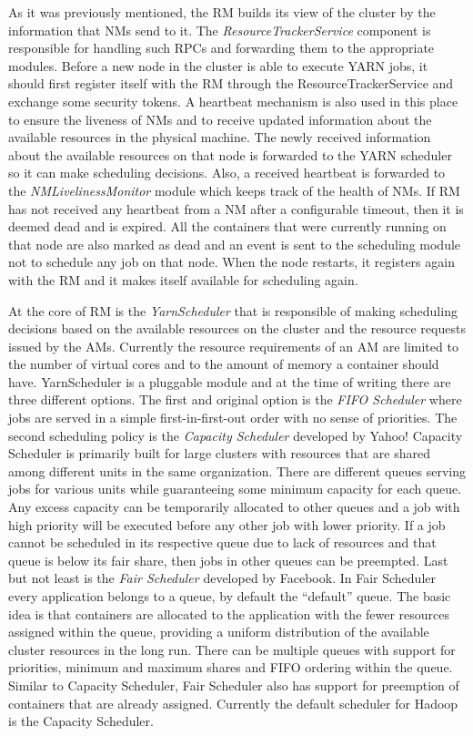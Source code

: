 As it was previously mentioned, the RM builds its view of the cluster
by the information that NMs send to it. The
\emph{ResourceTrackerService} component is responsible for handling such RPCs
and forwarding them to the appropriate modules. Before a new node in the
cluster is able to execute YARN jobs, it should first register itself
with the RM through the ResourceTrackerService and exchange some
security tokens. A heartbeat mechanism is also used in this place to
ensure the liveness of NMs and to receive updated information about
the available resources in the physical machine. The newly received
information about the available resources on that node is forwarded to the YARN
scheduler so it can make scheduling decisions. Also, a received
heartbeat is forwarded to the \emph{NMLivelinessMonitor} module which
keeps track of the health of NMs. If RM has not received any heartbeat
from a NM after a configurable timeout, then it is deemed dead and is
expired. All the containers that were currently running on that node
are also marked as dead and an event is sent to the scheduling module
not to schedule any job on that node. When the node restarts, it
registers again with the RM and it makes itself available for
scheduling again.

At the core of RM is the \emph{YarnScheduler} that is responsible of
making scheduling decisions based on the available resources on the
cluster and the resource requests issued by the AMs. Currently the
resource requirements of an AM are limited to the number of virtual
cores and to the amount of memory a container should
have. YarnScheduler is a pluggable module and at the time of writing
there are three different options. The first and original option is
the \emph{FIFO Scheduler} where jobs are served in a simple
first-in-first-out order with no sense of priorities. The second
scheduling policy is the \emph{Capacity Scheduler}
\cite{capacity_scheduler} developed by Yahoo! Capacity Scheduler
is primarily built for large clusters with resources that are shared
among different units in the same organization. There are different
queues serving jobs for various units while guaranteeing some minimum
capacity for each queue. Any excess capacity can be temporarily
allocated to other queues and a job with high priority will be executed
before any other job with lower priority. If a job cannot be scheduled
in its respective queue due to lack of resources and that queue is
below its fair share, then jobs in other queues can be preempted. Last
but not least is the \emph{Fair Scheduler} \cite{fair_scheduler}
developed by Facebook. In Fair Scheduler every application belongs to
a queue, by default the ``default'' queue. The basic idea is that
containers are allocated to the application with the fewer resources
assigned within the queue, providing a uniform distribution of the
available cluster resources in the long run. There can be multiple
queues with support for priorities, minimum and maximum shares and FIFO
ordering within the queue. Similar to Capacity Scheduler, Fair Scheduler
also has support for preemption of containers that are already
assigned. Currently the default scheduler for Hadoop is the Capacity Scheduler.

